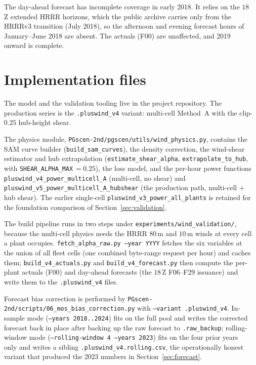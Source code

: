 \documentclass[11pt]{article}
\newcommand{\code}[1]{\texttt{\small #1}}
\begin{document}
The day-ahead forecast has incomplete coverage in early 2018. It relies
on the $18$\,Z extended HRRR horizons, which the public archive carries
only from the HRRRv3 transition (July 2018), so the afternoon and
evening forecast hours of January--June 2018 are absent. The actuals
(F00) are unaffected, and 2019 onward is complete.

\appendix
\section{Implementation files}
\label{app:files}

The model and the validation tooling live in the project repository. The
production series is the \code{.pluswind\_v4} variant: multi-cell
Method~A with the clip-$0.25$ hub-height shear.

The physics module, \code{PGscen-2nd/pgscen/utils/wind\_physics.py},
contains the SAM curve
builder (\code{build\_sam\_curves}), the density correction, the
wind-shear estimator and hub extrapolation
(\code{estimate\_shear\_alpha}, \code{extrapolate\_to\_hub}, with
\code{SHEAR\_ALPHA\_MAX}\,$=0.25$), the loss model, and the per-hour
power functions \code{pluswind\_v4\_power\_multicell\_A} (multi-cell,
no shear) and \code{pluswind\_v5\_power\_multicell\_A\_hubshear} (the
production path, multi-cell $+$ hub shear). The earlier single-cell
\code{pluswind\_v3\_power\_all\_plants} is retained for the foundation
comparison of Section~\ref{sec:validation}.

The build pipeline runs in two steps under
\code{experiments/wind\_validation/}, because the multi-cell physics
needs the HRRR $80$\,m and $10$\,m winds at every cell a plant occupies.
\code{fetch\_alpha\_raw.py --year YYYY} fetches the six variables at the
union of all fleet cells (one combined byte-range request per hour) and
caches them; \code{build\_v4\_actuals.py} and \code{build\_v4\_forecast.py}
then compute the per-plant actuals (F00) and day-ahead forecasts (the
$18$\,Z F06--F29 issuance) and write them to the \code{.pluswind\_v4}
files.

Forecast bias correction is performed by
\code{PGscen-2nd/scripts/06\_mos\_bias\_correction.py} with
\texttt{--variant .pluswind\_v4}. In-sample mode (\texttt{--years
2018..2024}) fits on the full pool and writes the corrected forecast
back in place after backing up the raw forecast to \code{.raw\_backup};
rolling-window mode (\texttt{--rolling-window 4 --years 2023}) fits on
the four prior years only and writes a sibling
\code{*.pluswind\_v4.rolling.csv}, the operationally honest variant that
produced the 2023 numbers in Section~\ref{sec:forecast}.
\end{document}
